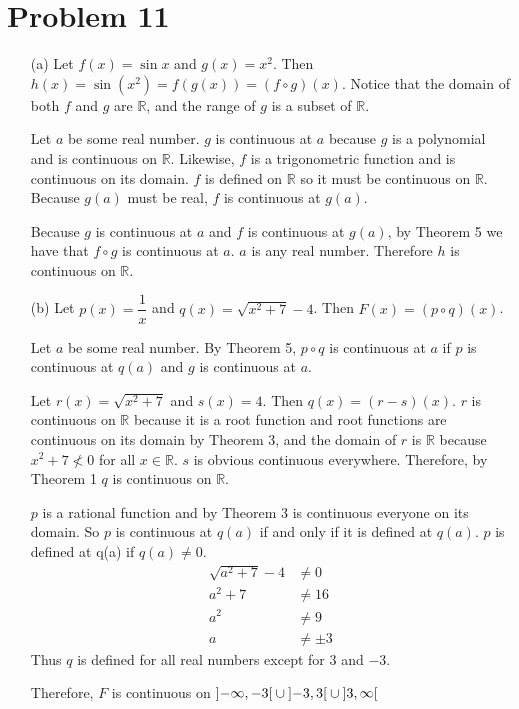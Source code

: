 \documentclass{article}
\newcommand*{\problem}[1]{\section*{Problem #1}}
\begin{document}
\problem{11}
\begin{itemize}
	\item[(a)]
	Let $f(x)=\sin x$ and $g(x)=x^2$. Then $h(x)=\sin(x^2)=f(g(x))=(f\circ g)(x)$. Notice that the domain of both $f$ and $g$ are $\mathbb{R}$, and the range of $g$ is a subset of $\mathbb{R}$.

	Let $a$ be some real number. $g$ is continuous at $a$ because $g$ is a polynomial and is continuous on $\mathbb{R}$. Likewise, $f$ is a trigonometric function and is continuous on its domain. $f$ is defined on $\mathbb{R}$ so it must be continuous on $\mathbb{R}$. Because $g(a)$ must be real, $f$ is continuous at $g(a)$.

	Because $g$ is continuous at $a$ and $f$ is continuous at $g(a)$, by Theorem 5 we have that $f\circ g$ is continuous at $a$. $a$ is any real number. Therefore $h$ is continuous on $\mathbb{R}$.

	\item[(b)]
	Let $p(x)=\dfrac{1}{x}$ and $q(x)=\sqrt{x^2+7}-4$. Then $F(x)=(p\circ q)(x)$.

	Let $a$ be some real number. By Theorem 5, $p\circ q$ is continuous at $a$ if $p$ is continuous at $q(a)$ and $g$ is continuous at $a$.

	Let $r(x)=\sqrt{x^2+7}$ and $s(x)=4$. Then $q(x)=(r-s)(x)$. $r$ is continuous on $\mathbb{R}$ because it is a root function and root functions are continuous on its domain by Theorem 3, and the domain of $r$ is $\mathbb{R}$ because $x^2+7\not<0$ for all $x\in\mathbb{R}$. $s$ is obvious continuous everywhere. Therefore, by Theorem 1 $q$ is continuous on $\mathbb{R}$.

	$p$ is a rational function and by Theorem 3 is continuous everyone on its domain. So $p$ is continuous at $q(a)$ if and only if it is defined at $q(a)$. $p$ is defined at q(a) if $q(a)\neq0$.
	\begin{align*}
		\sqrt{a^2+7}-4&\neq0 \\
		a^2+7&\neq16 \\
		a^2&\neq9 \\
		a&\neq\pm3
	\end{align*}
	Thus $q$ is defined for all real numbers except for $3$ and $-3$.

	Therefore, $F$ is continuous on $\interval[open left, open right]{-\infty}{-3}\cup\interval[open left, open right]{-3}{3}\cup\interval[open left, open right]{3}{\infty}$
\end{itemize}
\end{document}
